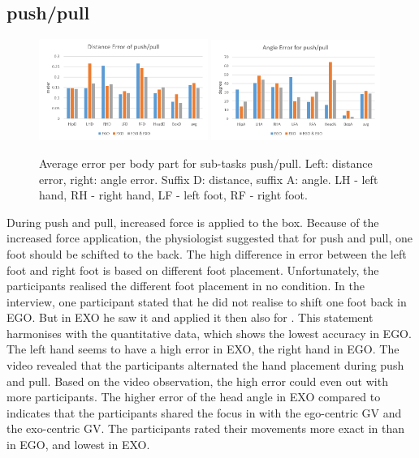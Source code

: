 \subsection{push/pull}
\begin{figure}[H]
	\centering
	\includegraphics[width=0.49\textwidth]{figures/distanceErrorPushPull.png}
	\includegraphics[width=0.49\textwidth]{figures/angleErrorPushPull.png}
	\caption[Average error per body part for sub-tasks push/pull.]{Average error per body part for sub-tasks push/pull. Left: distance error, right: angle error. Suffix D: distance, suffix A: angle. LH - left hand, RH - right hand, LF - left foot, RF - right foot.}
	\label{fig:errorPushPull}
\end{figure}
During push and pull, increased force is applied to the box. Because of the increased force application, the physiologist suggested that for push and pull, one foot should be schifted to the back. The high difference in error between the left foot and right foot is based on different foot placement. Unfortunately, the participants realised the different foot placement in no condition. In the interview, one participant stated that he did not realise to shift one foot back in EGO. But in EXO he saw it and applied it then also for \combi. This statement harmonises with the quantitative data, which shows the lowest accuracy in EGO. The left hand seems to have a high error in EXO, the right hand in EGO. The video revealed that the participants alternated the hand placement during push and pull. Based on the video observation, the high error could even out with more participants. The higher error of the head angle in EXO compared to \combi indicates that the participants shared the focus in \combi with the ego-centric GV and the exo-centric GV. The participants rated their movements more exact in \combi than in EGO, and lowest in EXO.

